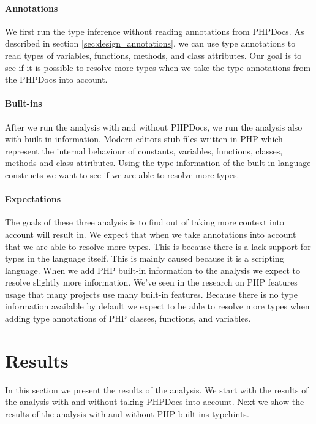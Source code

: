 \documentclass[../main.tex]{subfiles}
\begin{document}
	\paragraph{Annotations}
	We first run the type inference without reading annotations from PHPDocs.
	As described in section \ref{sec:design_annotations}, we can use type annotations to read types of variables, functions, methods, and class attributes.
	Our goal is to see if it is possible to resolve more types when we take the type annotations from the PHPDocs into account.
	
	\paragraph{Built-ins}
	After we run the analysis with and without PHPDocs, we run the analysis also with built-in information.
	Modern editors stub files written in PHP which represent the internal behaviour of constants, variables, functions, classes, methods and class attributes.
	Using the type information of the built-in language constructs we want to see if we are able to resolve more types.
	
	\paragraph{Expectations}
	The goals of these three analysis is to find out of taking more context into account will result in.
	We expect that when we take annotations into account that we are able to resolve more types.
	This is because there is a lack support for types in the language itself.
	This is mainly caused because it is a scripting language.
	When we add PHP built-in information to the analysis we expect to resolve slightly more information.
	We've seen in the research on PHP features usage\cite{Hil:13} that many projects use many built-in features.
	Because there is no type information available by default we expect to be able to resolve more types when adding type annotations of PHP classes, functions, and variables.
			
	\section{Results}\label{sec:evaluation_results}
	
	In this section we present the results of the analysis.
	We start with the results of the analysis with and without taking PHPDocs into account.
	Next we show the results of the analysis with and without PHP built-ins typehints.
\end{document}

